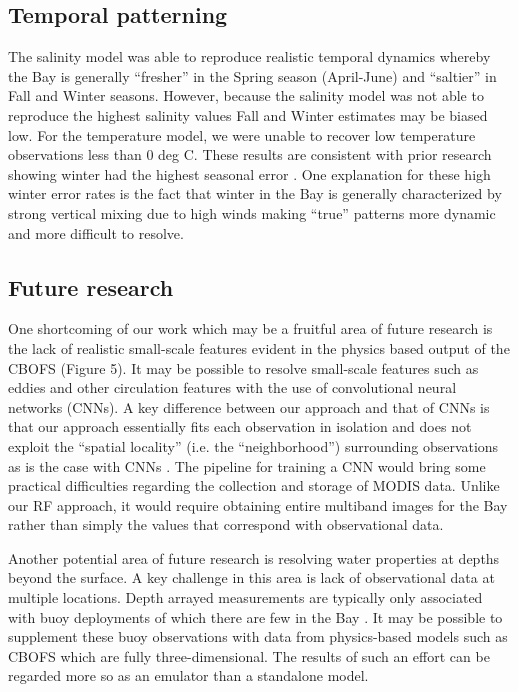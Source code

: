 \documentclass{article}
\begin{document}
\subsection{Temporal patterning}

The salinity model was able to reproduce realistic temporal dynamics whereby the Bay is generally “fresher” in the Spring season (April-June) and “saltier” in Fall and Winter seasons. However, because the salinity model was not able to reproduce the highest salinity values Fall and Winter estimates may be biased low. For the temperature model, we were unable to recover low temperature observations less than 0 deg C. These results are consistent with prior research showing winter had the highest seasonal error  \citet{geigerSatellitederivedCoastalOcean2013}. One explanation for these high winter error rates is the fact that winter in the Bay is generally characterized by strong vertical mixing due to high winds \citep{sonWaterPropertiesChesapeake2012, xuClimateForcingSalinity2012} making “true” patterns more dynamic and more difficult to resolve.


\subsection{Future research}

One shortcoming of our work which may be a fruitful area of future research is the lack of realistic small-scale features evident in the physics based output of the CBOFS (Figure 5). It may be possible to resolve small-scale features such as eddies and other circulation features with the use of convolutional neural networks (CNNs). A key difference between our approach and that of CNNs is that our approach essentially fits each observation in isolation and does not exploit the “spatial locality” (i.e. the “neighborhood”) surrounding observations as is the case with CNNs \citep{goodfellow2016convolutional}. The pipeline for training a CNN would bring some practical difficulties regarding the collection and storage of MODIS data. Unlike our RF approach, it would require obtaining entire multiband images for the Bay rather than simply the values that correspond with observational data.

Another potential area of future research is resolving water properties at depths beyond the surface. A key challenge in this area is lack of observational data at multiple locations. Depth arrayed measurements are typically only associated with buoy deployments of which there are few in the Bay \cite{vogelAssessingSatelliteSea2016}. It may be possible to supplement these buoy observations with data from physics-based models such as CBOFS which are fully three-dimensional. The results of such an effort can be regarded more so as an emulator than a standalone model.
\end{document}
